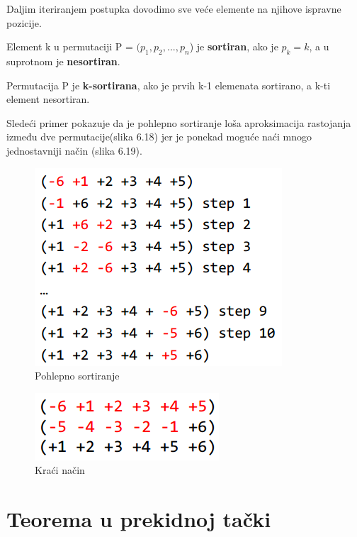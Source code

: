 \noindent Daljim iteriranjem postupka dovodimo sve veće elemente na njihove ispravne pozicije.

\newpage
\begin{definicija}{Element k u permutaciji P = $(p_1, p_2, ..., p_n$) je \textbf{sortiran}, ako je $p_k = k$, a u suprotnom je \textbf{nesortiran}.}
\end{definicija}

\begin{definicija}{Permutacija P je \textbf{k-sortirana}, ako je prvih k-1 elemenata sortirano, a k-ti element nesortiran.}
\end{definicija}

\noindent Sledeći primer pokazuje da je pohlepno sortiranje loša aproksimacija rastojanja između dve permutacije(slika 6.18) jer je ponekad moguće naći mnogo jednostavniji način (slika 6.19).\\

\begin{figure}[h]
\centering
\includegraphics[scale=0.75]{poglavlja/6/slike/los_greedy.PNG}
\caption{Pohlepno sortiranje}
\label{slika:X}
\end{figure}

\begin{figure}[h]
\centering
\includegraphics[scale=0.75]{poglavlja/6/slike/kraci.PNG}
\caption{Kraći način}
\label{slika:X}
\end{figure}

\section{Teorema u prekidnoj tački}

